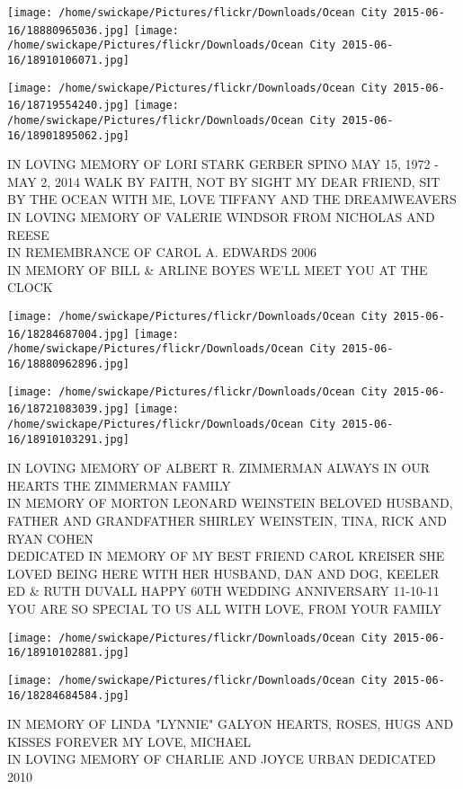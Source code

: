 \documentclass[10pt,letterpaper]{article}
\begin{document}
\texttt{[image: /home/swickape/Pictures/flickr/Downloads/Ocean City 2015-06-16/18880965036.jpg]}
\texttt{[image: /home/swickape/Pictures/flickr/Downloads/Ocean City 2015-06-16/18910106071.jpg]}

\texttt{[image: /home/swickape/Pictures/flickr/Downloads/Ocean City 2015-06-16/18719554240.jpg]}
\texttt{[image: /home/swickape/Pictures/flickr/Downloads/Ocean City 2015-06-16/18901895062.jpg]}

IN LOVING MEMORY OF LORI STARK GERBER SPINO MAY 15, 1972 {-} MAY 2, 2014 WALK BY FAITH, NOT BY SIGHT MY DEAR FRIEND, SIT BY THE OCEAN WITH ME, LOVE TIFFANY AND THE DREAMWEAVERS\\
IN LOVING MEMORY OF VALERIE WINDSOR FROM NICHOLAS AND REESE\\
IN REMEMBRANCE OF CAROL A. EDWARDS 2006\\
IN MEMORY OF BILL \& ARLINE BOYES WE'LL MEET YOU AT THE CLOCK
\pagebreak

\texttt{[image: /home/swickape/Pictures/flickr/Downloads/Ocean City 2015-06-16/18284687004.jpg]}
\texttt{[image: /home/swickape/Pictures/flickr/Downloads/Ocean City 2015-06-16/18880962896.jpg]}

\texttt{[image: /home/swickape/Pictures/flickr/Downloads/Ocean City 2015-06-16/18721083039.jpg]}
\texttt{[image: /home/swickape/Pictures/flickr/Downloads/Ocean City 2015-06-16/18910103291.jpg]}

IN LOVING MEMORY OF ALBERT R. ZIMMERMAN ALWAYS IN OUR HEARTS THE ZIMMERMAN FAMILY\\
IN MEMORY OF MORTON LEONARD WEINSTEIN BELOVED HUSBAND, FATHER AND GRANDFATHER SHIRLEY WEINSTEIN, TINA, RICK AND RYAN COHEN\\
DEDICATED IN MEMORY OF MY BEST FRIEND CAROL KREISER SHE LOVED BEING HERE WITH HER HUSBAND, DAN AND DOG, KEELER\\
ED \& RUTH DUVALL HAPPY 60TH WEDDING ANNIVERSARY 11{-}10{-}11 YOU ARE SO SPECIAL TO US ALL WITH LOVE, FROM YOUR FAMILY
\pagebreak

\texttt{[image: /home/swickape/Pictures/flickr/Downloads/Ocean City 2015-06-16/18910102881.jpg]}

\vspace{0.25in}
\texttt{[image: /home/swickape/Pictures/flickr/Downloads/Ocean City 2015-06-16/18284684584.jpg]}

IN MEMORY OF LINDA "LYNNIE" GALYON HEARTS, ROSES, HUGS AND KISSES FOREVER MY LOVE, MICHAEL\\
IN LOVING MEMORY OF CHARLIE AND JOYCE URBAN DEDICATED 2010
\pagebreak
\end{document}
